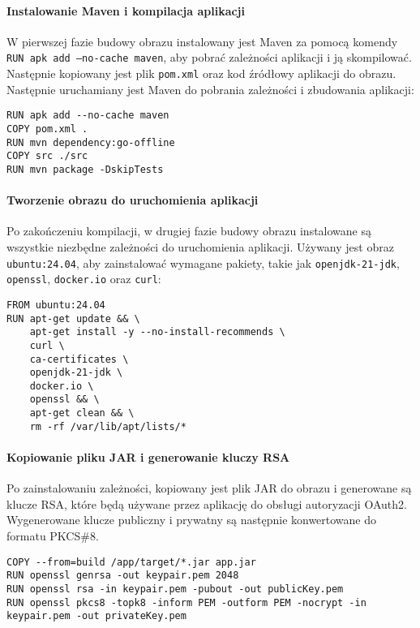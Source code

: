 \paragraph{Instalowanie Maven i kompilacja aplikacji}
W pierwszej fazie budowy obrazu instalowany jest Maven za pomocą komendy \texttt{RUN apk add --no-cache maven}, aby pobrać zależności aplikacji i ją skompilować. Następnie kopiowany jest plik \texttt{pom.xml} oraz kod źródłowy aplikacji do obrazu. Następnie uruchamiany jest Maven do pobrania zależności i zbudowania aplikacji:
\begin{lstlisting}
RUN apk add --no-cache maven
COPY pom.xml .
RUN mvn dependency:go-offline
COPY src ./src
RUN mvn package -DskipTests
\end{lstlisting}

\paragraph{Tworzenie obrazu do uruchomienia aplikacji}
Po zakończeniu kompilacji, w drugiej fazie budowy obrazu instalowane są wszystkie niezbędne zależności do uruchomienia aplikacji. Używany jest obraz \texttt{ubuntu:24.04}, aby zainstalować wymagane pakiety, takie jak \texttt{openjdk-21-jdk}, \texttt{openssl}, \texttt{docker.io} oraz \texttt{curl}:
\begin{lstlisting}
FROM ubuntu:24.04
RUN apt-get update && \
    apt-get install -y --no-install-recommends \
    curl \
    ca-certificates \
    openjdk-21-jdk \
    docker.io \
    openssl && \
    apt-get clean && \
    rm -rf /var/lib/apt/lists/*
\end{lstlisting}

\paragraph{Kopiowanie pliku JAR i generowanie kluczy RSA}
Po zainstalowaniu zależności, kopiowany jest plik JAR do obrazu i generowane są klucze RSA, które będą używane przez aplikację do obsługi autoryzacji OAuth2. Wygenerowane klucze publiczny i prywatny są następnie konwertowane do formatu PKCS\#8.
\begin{lstlisting}
COPY --from=build /app/target/*.jar app.jar
RUN openssl genrsa -out keypair.pem 2048
RUN openssl rsa -in keypair.pem -pubout -out publicKey.pem
RUN openssl pkcs8 -topk8 -inform PEM -outform PEM -nocrypt -in keypair.pem -out privateKey.pem
\end{lstlisting}

